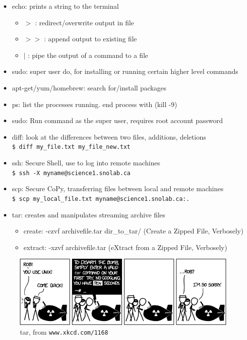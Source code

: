 \documentclass[11pt]{article}
\begin{document}
\begin{itemize}
\item echo: prints a string to the terminal
\begin{itemize}
\item $>$ : redirect/overwrite output in file
\item $>>$ : append output to existing file
\item $|$ : pipe the output of a command to a file 
\end{itemize}
\item sudo: super user do, for installing or running certain higher level commands
\item apt-get/yum/homebrew: search for/install packages 
\item ps: list the processes running. end process with  (kill -9) 
\item sudo: Run command as the super user, requires root account password
\item diff: look at the differences between two files, additions, deletions\\\texttt{\$ diff my\_file.txt my\_file\_new.txt}
\item ssh: Secure Shell, use to log into remote machines \\ \texttt{\$ ssh -X myname@science1.snolab.ca}
\item scp: Secure CoPy, transferring files between local and remote machines \\ \texttt{\$ scp my\_local\_file.txt myname@science1.snolab.ca:. }
\item tar: creates and manipulates streaming archive files
\begin{itemize}
\item create: -czvf archivefile.tar dir\_to\_tar/ (Create a Zipped File, Verbosely) 
\item extract: -xzvf archivefile.tar (eXtract from a Zipped File, Verbosely)
\end{itemize}
\end{itemize}
\begin{figure} [hb]
\centering
\includegraphics[width=\textwidth]{tar.png}
\caption{tar, from \texttt{www.xkcd.com/1168}}
\end{figure}
\end{document}
